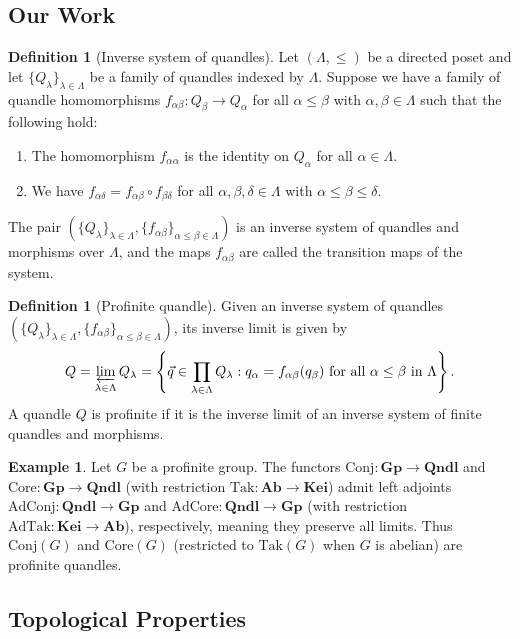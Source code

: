 \documentclass[reqno,dvipsnames]{amsart}
\renewcommand{\l}{\left}
\renewcommand{\r}{\right}
\renewcommand{\d}{\delta}
\renewcommand{\a}{\alpha}
\renewcommand{\b}{\beta}
\newcommand{\Ab}{\textbf{Ab}}
\newcommand{\Conj}{\text{Conj}}
\newcommand{\Tak}{\text{Tak}}
\theoremstyle{definition}
\newtheorem{definition}[theorem]{Definition}
\newtheorem{example}[theorem]{Example}
\begin{document}
{\subsection{Our Work}

\begin{definition}[Inverse system of quandles]
Let $(\Lambda,\leq)$ be a directed poset and let $\{Q_\lambda\}_{\lambda\in\Lambda}$ be a family of quandles indexed by $\Lambda$. Suppose we have a family of quandle homomorphisms $f_{\a\b}:Q_\b\to Q_\a$ for all $\a\leq\b$ with $\a,\b\in\Lambda$ such that the following hold:
\begin{enumerate}[label=(\roman*)]
    \item The homomorphism $f_{\a\a}$ is the identity on $Q_\a$ for all $\a\in\Lambda$.
    \item We have $f_{\a\d}=f_{\a\b}\circ f_{\b\d}$ for all $\a,\b,\d\in\Lambda$ with $\a\leq\b\leq\d$.
\end{enumerate}
The pair $(\{Q_\lambda\}_{\lambda\in\Lambda},\{f_{\a\b}\}_{\a\leq\b\in\Lambda})$ is an inverse system of quandles and morphisms over $\Lambda$, and the maps $f_{\a\b}$ are called the transition maps of the system.
\end{definition}

\begin{definition}[Profinite quandle]
Given an inverse system of quandles\\$(\{Q_\lambda\}_{\lambda\in\Lambda},\{f_{\a\b}\}_{\a\leq\b\in\Lambda})$, its inverse limit is given by
\[Q=\varprojlim_{\lambda\in\Lambda}Q_\lambda=\l\{\vec{q}\in\prod_{\lambda\in\Lambda}Q_\lambda:q_\a=f_{\a\b}(q_\b)\text{ for all }\a\leq\b\text{ in }\Lambda\r\}.\]
A quandle $Q$ is profinite if it is the inverse limit of an inverse system of finite quandles and morphisms.
\end{definition}

\begin{example}
Let $G$ be a profinite group. The functors $\Conj: \textbf{Gp} \to \textbf{Qndl}$ and $\text{Core}: \textbf{Gp} \to \textbf{Qndl}$ (with restriction $\Tak: \Ab \to \textbf{Kei}$) admit left adjoints $\text{AdConj}: \textbf{Qndl} \to \textbf{Gp}$ and $\text{AdCore}: \textbf{Qndl} \to \textbf{Gp}$ (with restriction $\text{AdTak}: \textbf{Kei} \to \textbf{Ab}$), respectively, meaning they preserve all limits. Thus $\Conj(G)$ and $\text{Core}(G)$ (restricted to $\Tak(G)$ when $G$ is abelian) are profinite quandles.
\end{example}

\subsection{Topological Properties}

}
\end{document}
